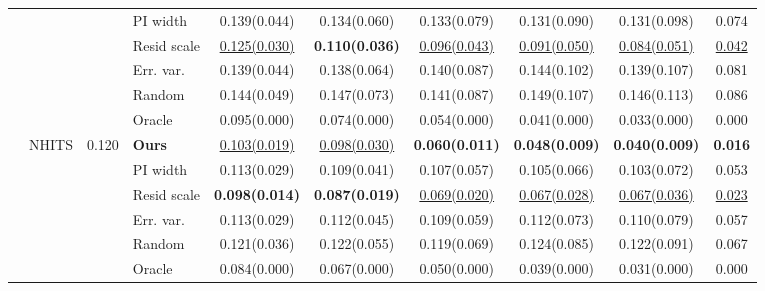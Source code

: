 \begin{table}[t]
\begin{tabular}{@{}llrlcccccc@{}}
 &  &  & PI width & 0.139(0.044) & 0.134(0.060) & 0.133(0.079) & 0.131(0.090) & 0.131(0.098) & 0.074 \\
 &  &  & Resid scale & \underline{0.125(0.030)} & \textbf{0.110(0.036)} & \underline{0.096(0.043)} & \underline{0.091(0.050)} & \underline{0.084(0.051)} & \underline{0.042} \\
 &  &  & Err. var. & 0.139(0.044) & 0.138(0.064) & 0.140(0.087) & 0.144(0.102) & 0.139(0.107) & 0.081 \\
\cmidrule(lr){4-10}
 &  &  & Random & 0.144(0.049) & 0.147(0.073) & 0.141(0.087) & 0.149(0.107) & 0.146(0.113) & 0.086 \\
 &  &  & Oracle & 0.095(0.000) & 0.074(0.000) & 0.054(0.000) & 0.041(0.000) & 0.033(0.000) & 0.000 \\
\cmidrule(lr){2-10}
 & NHITS & 0.120 & \textbf{Ours} & \underline{0.103(0.019)} & \underline{0.098(0.030)} & \textbf{0.060(0.011)} & \textbf{0.048(0.009)} & \textbf{0.040(0.009)} & \textbf{0.016} \\
 &  &  & PI width & 0.113(0.029) & 0.109(0.041) & 0.107(0.057) & 0.105(0.066) & 0.103(0.072) & 0.053 \\
 &  &  & Resid scale & \textbf{0.098(0.014)} & \textbf{0.087(0.019)} & \underline{0.069(0.020)} & \underline{0.067(0.028)} & \underline{0.067(0.036)} & \underline{0.023} \\
 &  &  & Err. var. & 0.113(0.029) & 0.112(0.045) & 0.109(0.059) & 0.112(0.073) & 0.110(0.079) & 0.057 \\
\cmidrule(lr){4-10}
 &  &  & Random & 0.121(0.036) & 0.122(0.055) & 0.119(0.069) & 0.124(0.085) & 0.122(0.091) & 0.067 \\
 &  &  & Oracle & 0.084(0.000) & 0.067(0.000) & 0.050(0.000) & 0.039(0.000) & 0.031(0.000) & 0.000 \\
\bottomrule
\end{tabular}
\end{table}
